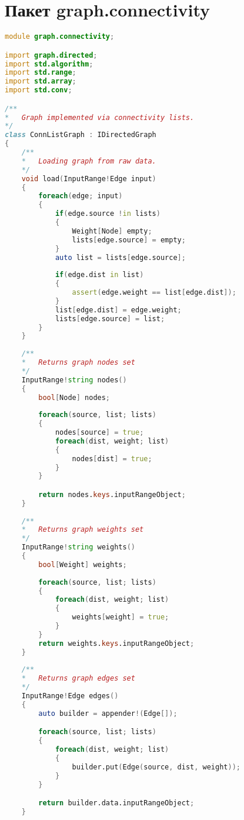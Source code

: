 \documentclass[russian,utf8,emptystyle]{eskdtext}
\begin{document}
\section{Пакет graph.connectivity}
\begin{lstlisting}[language=D]
module graph.connectivity;

import graph.directed;
import std.algorithm;
import std.range;
import std.array;
import std.conv;

/**
*   Graph implemented via connectivity lists.
*/
class ConnListGraph : IDirectedGraph
{
    /**
    *   Loading graph from raw data.
    */
    void load(InputRange!Edge input)
    {
        foreach(edge; input)
        {
            if(edge.source !in lists)
            {
                Weight[Node] empty;
                lists[edge.source] = empty;
            }
            auto list = lists[edge.source];
            
            if(edge.dist in list)
            {
                assert(edge.weight == list[edge.dist]);
            } 
            list[edge.dist] = edge.weight;
            lists[edge.source] = list;
        }
    }
    
    /**
    *   Returns graph nodes set
    */
    InputRange!string nodes()
    {
        bool[Node] nodes;
        
        foreach(source, list; lists)
        {
            nodes[source] = true;
            foreach(dist, weight; list)
            {
                nodes[dist] = true;
            }
        }

        return nodes.keys.inputRangeObject;
    }
    
    /**
    *   Returns graph weights set
    */
    InputRange!string weights()
    {
        bool[Weight] weights;
        
        foreach(source, list; lists)
        {
            foreach(dist, weight; list)
            {
                weights[weight] = true;
            }
        }
        return weights.keys.inputRangeObject;
    }
    
    /**
    *   Returns graph edges set
    */
    InputRange!Edge edges()
    {
        auto builder = appender!(Edge[]);

        foreach(source, list; lists)
        {
            foreach(dist, weight; list)
            {
                builder.put(Edge(source, dist, weight));
            }
        }

        return builder.data.inputRangeObject;
    }
    

\end{lstlisting}
\end{document}
